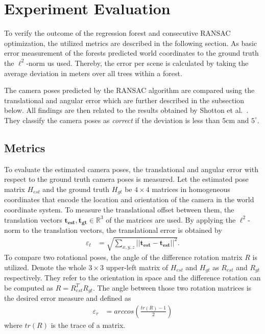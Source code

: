 \documentclass[final]{cvpr}
\begin{document}
\section{Experiment Evaluation} \label{sec:eval}
To verify the outcome of the regression forest and consecutive RANSAC optimization, the utilized metrics are described
in the following section. As basic error measurement of the forests predicted world coordinates to the ground truth the 
$\ell^2$-norm us used. Thereby, the error per scene is calculated by taking the average deviation in meters 
over all trees within a forest. 

The camera poses predicted by the RANSAC algorithm are compared using the translational and angular error 
which are further described in the subsection below. All findings are then related to the results obtained by 
Shotton et al.~\cite{shotton2013}. They classify the camera poses as \textit{correct} if the deviation is less
than $5$cm and $5^\circ$. 


\subsection{Metrics} \label{subsec:metrics}
To evaluate the estimated camera poses, the translational and angular error with respect to the 
ground truth camera poses is measured. Let the estimated pose matrix $H_{est}$ and the ground truth 
$H_{gt}$ be $4 \times 4$ matrices
in homogeneous coordinates that encode the location and orientation of the camera in the world 
coordinate system. To measure the translational offset between them, the translation vectors 
$\boldsymbol{t_{est}}, \boldsymbol{t_{gt}} \in \mathbb{R}^3$ of the matrices are used.
By applying the $\ell^2$-norm to the translation vectors, the translational error is obtained by
\begin{align}
    \varepsilon_t &= \sqrt{\sum_{x,y,z}||\boldsymbol{t_{est}} - \boldsymbol{t_{est}}||^2}.
\end{align}
To compare two rotational poses, the angle of the difference rotation matrix $R$ is utilized. 
Denote the whole $3\times3$ upper-left matrix of $H_{est}$ and $H_{gt}$ as $R_{est}$ and 
$R_{gt}$ respectively. They refer to the orientation in space and the difference rotation can be computed 
as $R = R_{est}^TR_{gt}$. The angle between those two rotation matrices is the desired
error measure and defined as
\begin{align}
    \varepsilon_r &= arccos \left( \frac{tr(R)-1}{2} \right)
\end{align}
where $tr(R)$ is the trace of a matrix.
\end{document}

